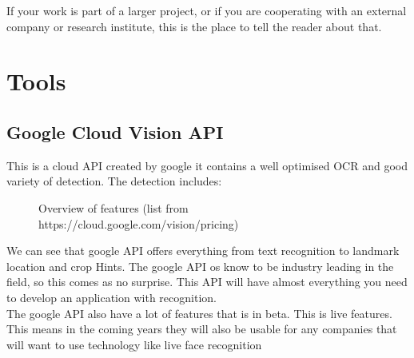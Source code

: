 If your work is part of a larger project, or if you are cooperating with an external company or research institute, this is the place to tell the reader about that.

\section{Tools}\label{sec:tools}
\subsection{Google Cloud Vision API}\label{subsec:API_Google}

This is a cloud API created by google it contains a well optimised OCR and good variety of detection.
The detection includes:

\begin{figure}[h]
    \caption{Overview of features (list from https://cloud.google.com/vision/pricing)}
    \label{fig:Features}
\end{figure}

We can see that google API offers everything from text recognition to landmark location and crop Hints.
The google API os know to be industry leading in the field, so this comes as no surprise.
This API will have almost everything you need to develop an application with recognition.
\\
The google API also have a lot of features that is in beta.
This is live features.
This means in the coming years they will also be usable for any companies that will want to use technology like live face recognition
\clearpage


